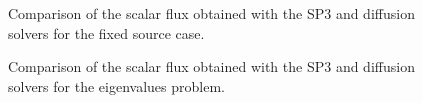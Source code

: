 \documentclass[letterpaper]{article}
\begin{document}
\begin{figure}[htbp!]
    \centering
    \caption{Comparison of the scalar flux obtained with the SP3 and diffusion solvers for the fixed source case.}
    \label{res:1d-fixed}
\end{figure}

\begin{figure}[htbp!]
    \centering
    \caption{Comparison of the scalar flux obtained with the SP3 and diffusion solvers for the eigenvalues problem.}
    \label{res:1d-crit}
\end{figure}
\end{document}
